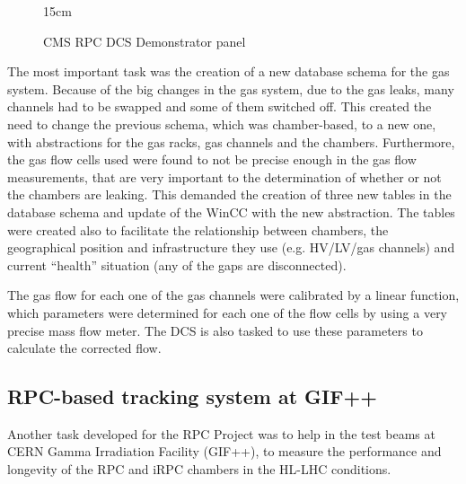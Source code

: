 \begin{figure}[!htm]{15cm}
\caption{CMS RPC DCS Demonstrator panel}%
\label{fig:RPC_DCS_Demo_panel}
\end{figure}

The most important task was the creation of a new database schema for the gas system. Because of the big changes in the gas system, due to the gas leaks, many channels had to be swapped and some of them switched off. This created the need to change the previous schema, which was chamber-based, to a new one, with abstractions for the gas racks, gas channels and the chambers. Furthermore, the gas flow cells used were found to not be precise enough in the gas flow measurements, that are very important to the determination of whether or not the chambers are leaking. This demanded the creation of three new tables in the database schema and update of the WinCC with the new abstraction. The tables were created also to facilitate the relationship between chambers, the geographical position and infrastructure they use (e.g. HV/LV/gas channels) and current ``health'' situation (any of the gaps are disconnected).

The gas flow for each one of the gas channels were calibrated by a linear function, which parameters were determined for each one of the flow cells by using a very precise mass flow meter. The DCS is also tasked to use these parameters to calculate the corrected flow.

\subsection{RPC-based tracking system at GIF++}

Another task developed for the RPC Project was to help in the test beams at CERN Gamma Irradiation Facility (GIF++), to measure the performance and longevity of the RPC and iRPC chambers in the HL-LHC conditions. 

